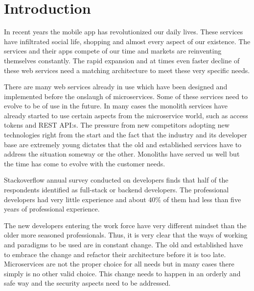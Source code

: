 


\section{Introduction}
\begin{sloppypar}
    In recent years the mobile app has revolutionized our daily lives. 
    These services have infiltrated social life, shopping and almost 
    every aspect of our existence. The services and their apps compete of 
    our time and markets are reinventing themselves constantly. The rapid 
    expansion and at times even faster decline of these web services 
    need a matching architecture to meet these very specific needs. 
\end{sloppypar}
\begin{sloppypar}
    There are many web services already in use which have been designed and 
    implemented before the onslaugh of microservices. Some of these services 
    need to evolve to be of use in the future. In many cases the monolith 
    services have already started to use certain aspects from the microservice 
    world, such as access tokens and REST API:s. The pressure from new 
    competitors adopting new technologies right from the start and the fact 
    that the industry and its developer base are extremely young dictates that 
    the old and established services have to address the situation someway or 
    the other. Monoliths have served us well but the time has come to evolve 
    with the customer needs.
\end{sloppypar}
\begin{sloppypar}
    Stackoverflow annual survey \citep{stackoverflowsurvey2019} conducted on 
    developers finds that half of the respondents identified as full-stack or 
    backend developers. The professional developers had very little experience 
    and about 40\% of them had less than five years of professional experience. 
\end{sloppypar}
\begin{sloppypar}
    The new developers entering the work force have very different mindset than 
    the older more seasoned professionals. Thus, it is very clear that the ways 
    of working and paradigms to be used are in constant change. The old and 
    established have to embrace the change and refactor their architecture 
    before it is too late. Microservices are not the proper choice for all needs
     \citep{newman2019} but in many cases there simply is no other valid choice.
    This change needs to happen in an orderly and safe way and the security 
    aspects need to be addressed. 
\end{sloppypar}
